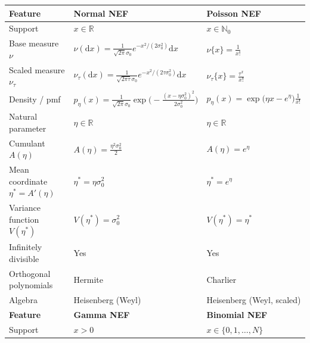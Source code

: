 \documentclass[a4paper,11pt]{article}
\numberwithin{equation}{section}
\theoremstyle{plain}
\theoremstyle{definition}
\theoremstyle{remark}
\newcommand{\R}{\ensuremath{\mathbb{R}}\xspace}
\newcommand{\1}{\ensuremath{\mathds{1}}\xspace}
\newcommand{\dd}{\ensuremath{{\textrm{d}}}\xspace}
\begin{document}
\begin{table}[p]
\centering
\scriptsize
\renewcommand{\arraystretch}{1.25}
\setlength{\tabcolsep}{3.5pt}

\begin{tabularx}{\linewidth}{lXX}
\toprule

\textbf{Feature} 
& \textbf{Normal NEF} 
& \textbf{Poisson NEF}
\\
\midrule

Support
& $x\in\R$
& $x\in\mathbb{N}_0$
\\[3pt]

Base measure $\nu$
& $\nu(\dd x)=\frac{1}{\sqrt{2\pi}\sigma_0}e^{-x^2/(2\sigma_0^2)}\dd x$
& $\nu\{x\}=\frac{1}{x!}$
\\[3pt]

Scaled measure $\nu_\tau$
& $\nu_\tau(\dd x)=\frac{1}{\sqrt{2\pi\tau}\sigma_0}e^{-x^2/(2\tau\sigma_0^2)}\dd x$
& $\nu_\tau\{x\}=\frac{\tau^x}{x!}$
\\[3pt]

Density / pmf
& $p_\eta(x)=\frac{1}{\sqrt{2\pi}\sigma_0}\exp\!\Big(-\frac{(x-\eta\sigma_0^2)^2}{2\sigma_0^2}\Big)$
& $p_\eta(x)=\exp\!\big(\eta x-e^\eta\big)\frac{1}{x!}$
\\[3pt]

Natural parameter
& $\eta\in\R$
& $\eta\in\R$
\\[3pt]

Cumulant $A(\eta)$
& $A(\eta)=\frac{\eta^2\sigma_0^2}{2}$
& $A(\eta)=e^\eta$
\\[3pt]

Mean coordinate $\eta^\ast=A'(\eta)$
& $\eta^\ast=\eta\sigma_0^2$
& $\eta^\ast=e^\eta$
\\[3pt]

Variance function $V(\eta^\ast)$
& $V(\eta^\ast)=\sigma_0^2$
& $V(\eta^\ast)=\eta^\ast$
\\[3pt]

Infinitely divisible
& Yes
& Yes
\\[3pt]

Orthogonal polynomials
& Hermite
& Charlier
\\[3pt]

Algebra
& Heisenberg (Weyl)
& Heisenberg (Weyl, scaled)
\\

\midrule

\textbf{Feature} 
& \textbf{Gamma NEF} 
& \textbf{Binomial NEF}
\\
\midrule

Support
& $x>0$
& $x\in\{0,1,\dots,N\}$
\\[3pt]


\end{tabularx}
\end{table}
\end{document}

